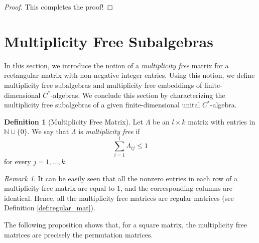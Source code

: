 \documentclass[12pt,a4paper]{amsart}
\theoremstyle{plain}
\theoremstyle{definition}
\newtheorem{definition}[theorem]{Definition}
\theoremstyle{remark}
\newtheorem{remark}[theorem]{Remark}
\numberwithin{equation}{section}
\theoremstyle{ser}
\theoremstyle{serr}
\theoremstyle{ser}
\theoremstyle{ser}
\theoremstyle{collabquestion}
\newcommand{\N}{\mathbb{N}}
\newcommand{\<}{\langle}
\renewcommand{\>}{\rangle}
\begin{document}
\begin{proof}
This completes the proof!
\end{proof}

    \section{Multiplicity Free Subalgebras}
    \label{sec:mult_free}

In this section, we introduce the notion of a \emph{multiplicity free} matrix for a rectangular matrix with non-negative integer entries. Using this notion, we define multiplicity free subalgebras and multiplicity free embeddings of finite-dimensional $C^*$-algebras. We conclude this section by characterizing the multiplicity free subalgebras of a given finite-dimensional unital $C^*$-algebra.

\begin{definition}[Multiplicity Free Matrix]\label{def:multiplicity_free_mat}
    Let $\Lambda$ be an $l \times k$ matrix with entries in $\N \cup \{0\}$. We say that $\Lambda$ is \emph{multiplicity free} if
    \[
        \sum_{i=1}^{l} \Lambda_{ij} \leq 1
    \]
    for every $j=1,\dots,k$.
\end{definition}
\begin{remark}\label{rem:multiplicity_implies_reg}
 It can be easily seen that all the nonzero entries in each row of a multiplicity free matrix are equal to $1$, and the corresponding columns are identical. Hence, all the multiplicity free matrices are regular matrices (see Definition \ref{def:regular_mat}).
   \end{remark}

The following proposition shows that, for a square matrix, the multiplicity free matrices are precisely the permutation matrices.
\end{document}
